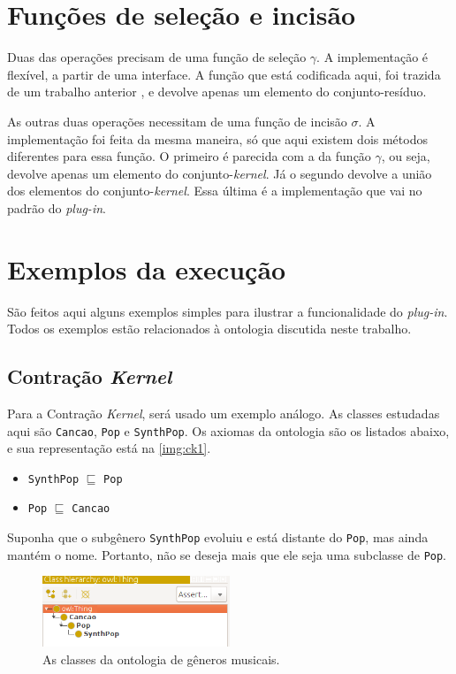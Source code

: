 \section{Funções de seleção e incisão}

Duas das operações precisam de uma função de seleção $ \gamma $. A implementação é flexível, a partir de uma interface. A função que está codificada aqui, foi trazida de um trabalho anterior \citep{logicaMatos}, e devolve apenas um elemento do conjunto-resíduo.

As outras duas operações necessitam de uma função de incisão $ \sigma $. A implementação foi feita da mesma maneira, só que aqui existem dois métodos diferentes para essa função. O primeiro é parecida com a da função $ \gamma $, ou seja, devolve apenas um elemento do conjunto-\textit{kernel}. Já o segundo devolve a união dos elementos do conjunto-\textit{kernel}. Essa última é a im\-ple\-men\-ta\-ção que vai no padrão do \textit{plug-in}.

\section{Exemplos da execução}

São feitos aqui alguns exemplos simples para ilustrar a funcionalidade do \textit{plug-in}. Todos os exemplos estão relacionados à ontologia discutida neste trabalho.

\subsection{Contração \textit{Kernel}}

Para a Contração \textit{Kernel}, será usado um exemplo análogo. As classes estudadas aqui são \texttt{Cancao}, \texttt{Pop} e \texttt{SynthPop}. Os axiomas da ontologia são os listados abaixo, e sua representação está na \autoref{img:ck1}.

\begin{itemize}
	\item \texttt{SynthPop} $ \sqsubseteq $ \texttt{Pop}
	\item \texttt{Pop} $ \sqsubseteq $ \texttt{Cancao}
\end{itemize}

Suponha que o subgênero \texttt{SynthPop} evoluiu e está distante do \texttt{Pop}, mas ainda mantém o nome. Portanto, não se deseja mais que ele seja uma subclasse de \texttt{Pop}.

\begin{figure}[H]
	\centering
	\includegraphics[width=0.5\textwidth]{Capitulos/Implementacao/ck1.png}
	\caption{As classes da ontologia de gêneros musicais.}
	\label{img:ck1}
\end{figure}


